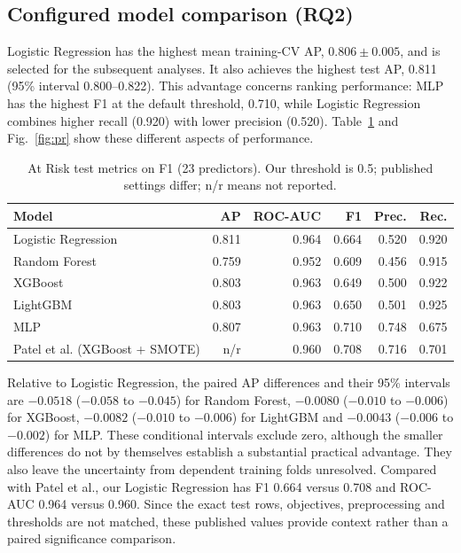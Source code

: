 \documentclass[runningheads]{llncs}
\begin{document}
\subsection{Configured model comparison (RQ2)}
Logistic Regression has the highest mean training-CV AP, $0.806\pm0.005$, and is selected for the subsequent analyses. It also achieves the highest test AP, 0.811 (95\% interval 0.800--0.822). This advantage concerns ranking performance: MLP has the highest F1 at the default threshold, 0.710, while Logistic Regression combines higher recall (0.920) with lower precision (0.520). Table~\ref{tab:models} and Fig.~\ref{fig:pr} show these different aspects of performance.

\begin{table}[!htbp]\caption{At Risk test metrics on F1 (23 predictors). Our threshold is 0.5; published settings differ; n/r means not reported.}\label{tab:models}\centering\small\begin{tabular}{>{\raggedright\arraybackslash}p{}rrrrr}\toprule Model & AP & ROC-AUC & F1 & Prec. & Rec. \\ \midrule
Logistic Regression & 0.811 & 0.964 & 0.664 & 0.520 & 0.920 \\
Random Forest & 0.759 & 0.952 & 0.609 & 0.456 & 0.915 \\
XGBoost & 0.803 & 0.963 & 0.649 & 0.500 & 0.922 \\
LightGBM & 0.803 & 0.963 & 0.650 & 0.501 & 0.925 \\
MLP & 0.807 & 0.963 & 0.710 & 0.748 & 0.675 \\\midrule Patel et al. (XGBoost + SMOTE) & n/r & 0.960 & 0.708 & 0.716 & 0.701 \\
\bottomrule\end{tabular}\end{table}


Relative to Logistic Regression, the paired AP differences and their 95\% intervals are $-0.0518$ ($-0.058$ to $-0.045$) for Random Forest, $-0.0080$ ($-0.010$ to $-0.006$) for XGBoost, $-0.0082$ ($-0.010$ to $-0.006$) for LightGBM and $-0.0043$ ($-0.006$ to $-0.002$) for MLP. These conditional intervals exclude zero, although the smaller differences do not by themselves establish a substantial practical advantage. They also leave the uncertainty from dependent training folds unresolved. Compared with Patel et al., our Logistic Regression has F1 0.664 versus 0.708 and ROC-AUC 0.964 versus 0.960. Since the exact test rows, objectives, preprocessing and thresholds are not matched, these published values provide context rather than a paired significance comparison.
\end{document}
